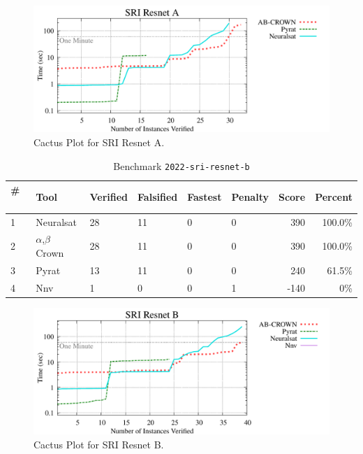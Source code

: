 \begin{figure}[h]
\centerline{\includegraphics[width=\textwidth]{cactus/2022_sri_resnet_a.pdf}}
\caption{Cactus Plot for SRI Resnet A.}
\label{fig:quantPic}
\end{figure}



\begin{table}[h]
\begin{center}
\caption{Benchmark \texttt{2022-sri-resnet-b}} \label{tab:cat_{cat}}
{\setlength{\tabcolsep}{2pt}
\begin{tabular}[h]{@{}llllllrr@{}}
\toprule
\textbf{\# ~} & \textbf{Tool} & \textbf{Verified} & \textbf{Falsified} & \textbf{Fastest} & \textbf{Penalty} & \textbf{Score} & \textbf{Percent}\\
\midrule
1 & Neuralsat & 28 & 11 & 0 & 0 & 390 & 100.0\% \\
2 & $\alpha$,$\beta$ Crown & 28 & 11 & 0 & 0 & 390 & 100.0\% \\
3 & Pyrat & 13 & 11 & 0 & 0 & 240 & 61.5\% \\
4 & Nnv & 1 & 0 & 0 & 1 & -140 & 0\% \\
\bottomrule
\end{tabular}
}
\end{center}
\end{table}



\begin{figure}[h]
\centerline{\includegraphics[width=\textwidth]{cactus/2022_sri_resnet_b.pdf}}
\caption{Cactus Plot for SRI Resnet B.}
\label{fig:quantPic}
\end{figure}


